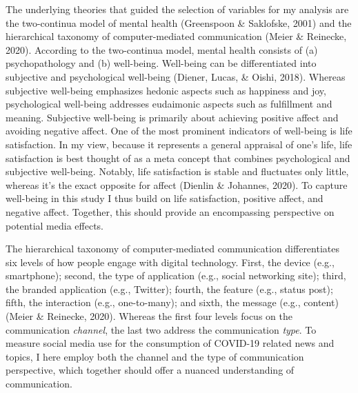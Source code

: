 \documentclass[
  man,mask]{apa6}
\begin{document}
The underlying theories that guided the selection of variables for my analysis are the two-continua model of mental health (Greenspoon \& Saklofske, 2001) and the hierarchical taxonomy of computer-mediated communication (Meier \& Reinecke, 2020).
According to the two-continua model, mental health consists of (a) psychopathology and (b) well-being.
Well-being can be differentiated into subjective and psychological well-being (Diener, Lucas, \& Oishi, 2018).
Whereas subjective well-being emphasizes hedonic aspects such as happiness and joy, psychological well-being addresses eudaimonic aspects such as fulfillment and meaning.
Subjective well-being is primarily about achieving positive affect and avoiding negative affect.
One of the most prominent indicators of well-being is life satisfaction.
In my view, because it represents a general appraisal of one's life, life satisfaction is best thought of as a meta concept that combines psychological and subjective well-being.
Notably, life satisfaction is stable and fluctuates only little, whereas it's the exact opposite for affect (Dienlin \& Johannes, 2020).
To capture well-being in this study I thus build on life satisfaction, positive affect, and negative affect.
Together, this should provide an encompassing perspective on potential media effects.

The hierarchical taxonomy of computer-mediated communication differentiates six levels of how people engage with digital technology.
First, the device (e.g., smartphone); second, the type of application (e.g., social networking site); third, the branded application (e.g., Twitter); fourth, the feature (e.g., status post); fifth, the interaction (e.g., one-to-many); and sixth, the message (e.g., content) (Meier \& Reinecke, 2020).
Whereas the first four levels focus on the communication \emph{channel}, the last two address the communication \emph{type}.
To measure social media use for the consumption of COVID-19 related news and topics, I here employ both the channel and the type of communication perspective, which together should offer a nuanced understanding of communication.
\end{document}
